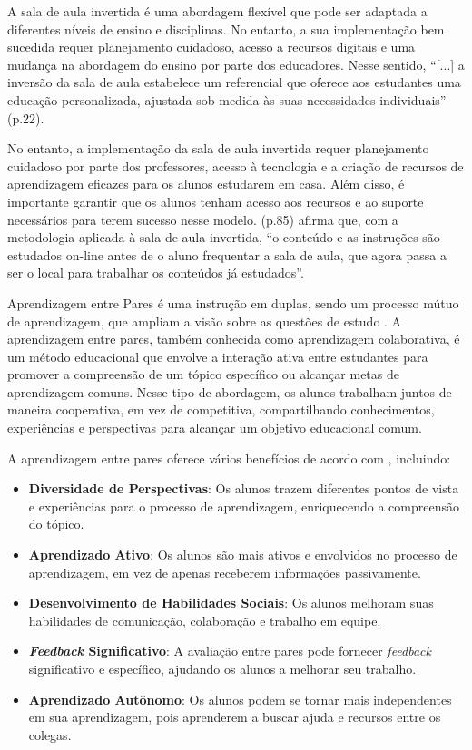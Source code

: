 A sala de aula invertida é uma abordagem flexível que pode ser adaptada a diferentes níveis de ensino e disciplinas. No entanto, a sua implementação bem sucedida requer planejamento cuidadoso, acesso a recursos digitais e uma mudança na abordagem do ensino por parte dos educadores. Nesse sentido, ``[...] a inversão da sala de aula estabelece um referencial que oferece aos estudantes uma educação personalizada, ajustada sob medida às suas necessidades individuais'' \cite{BERGMANNSANS2016} (p.22).

No entanto, a implementação da sala de aula invertida requer planejamento cuidadoso por parte dos professores, acesso à tecnologia e a criação de recursos de aprendizagem eficazes para os alunos estudarem em casa. Além disso, é importante garantir que os alunos tenham acesso aos recursos e ao suporte necessários para terem sucesso nesse modelo.  (p.85) afirma que, com a metodologia aplicada à sala de aula invertida, ``o conteúdo e as instruções são estudados on-line antes de o aluno frequentar a sala de aula, que agora passa a ser o local para trabalhar os conteúdos já estudados''.

Aprendizagem entre Pares é uma instrução em duplas, sendo um processo mútuo de aprendizagem, que ampliam a visão sobre as questões de estudo \cite{BACICHMORAN2018}. A aprendizagem entre pares, também conhecida como aprendizagem colaborativa, é um método educacional que envolve a interação ativa entre estudantes para promover a compreensão de um tópico específico ou alcançar metas de aprendizagem comuns. Nesse tipo de abordagem, os alunos trabalham juntos de maneira cooperativa, em vez de competitiva, compartilhando conhecimentos, experiências e perspectivas para alcançar um objetivo educacional comum.

A aprendizagem entre pares oferece vários benefícios de acordo com , incluindo:

\begin{itemize}
    \item \textbf{Diversidade de Perspectivas}: Os alunos trazem diferentes pontos de vista e experiências para o processo de aprendizagem, enriquecendo a compreensão do tópico.
    \item \textbf{Aprendizado Ativo}: Os alunos são mais ativos e envolvidos no processo de aprendizagem, em vez de apenas receberem informações passivamente.
    \item \textbf{Desenvolvimento de Habilidades Sociais}: Os alunos melhoram suas habilidades de comunicação, colaboração e trabalho em equipe.
    \item \textbf{\textit{Feedback} Significativo}: A avaliação entre pares pode fornecer \textit{feedback} significativo e específico, ajudando os alunos a melhorar seu trabalho.
    \item \textbf{Aprendizado Autônomo}: Os alunos podem se tornar mais independentes em sua aprendizagem, pois aprenderem a buscar ajuda e recursos entre os colegas.
\end{itemize}

